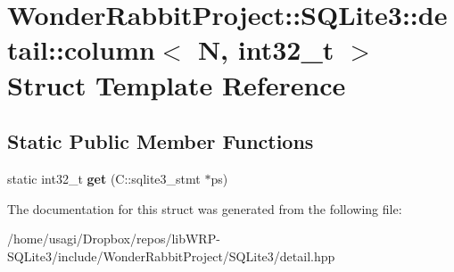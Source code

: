 \hypertarget{structWonderRabbitProject_1_1SQLite3_1_1detail_1_1column_3_01N_00_01int32__t_01_4}{\section{Wonder\-Rabbit\-Project\-:\-:S\-Q\-Lite3\-:\-:detail\-:\-:column$<$ N, int32\-\_\-t $>$ Struct Template Reference}
\label{structWonderRabbitProject_1_1SQLite3_1_1detail_1_1column_3_01N_00_01int32__t_01_4}
}
\subsection*{Static Public Member Functions}
\begin{DoxyCompactItemize}
\item 
\hypertarget{structWonderRabbitProject_1_1SQLite3_1_1detail_1_1column_3_01N_00_01int32__t_01_4_a562d31e968e4b0fb69dabe8f4481c43d}{static int32\-\_\-t {\bfseries get} (C\-::sqlite3\-\_\-stmt $\ast$ps)}\label{structWonderRabbitProject_1_1SQLite3_1_1detail_1_1column_3_01N_00_01int32__t_01_4_a562d31e968e4b0fb69dabe8f4481c43d}

\end{DoxyCompactItemize}


The documentation for this struct was generated from the following file\-:\begin{DoxyCompactItemize}
\item 
/home/usagi/\-Dropbox/repos/lib\-W\-R\-P-\/\-S\-Q\-Lite3/include/\-Wonder\-Rabbit\-Project/\-S\-Q\-Lite3/detail.\-hpp\end{DoxyCompactItemize}
